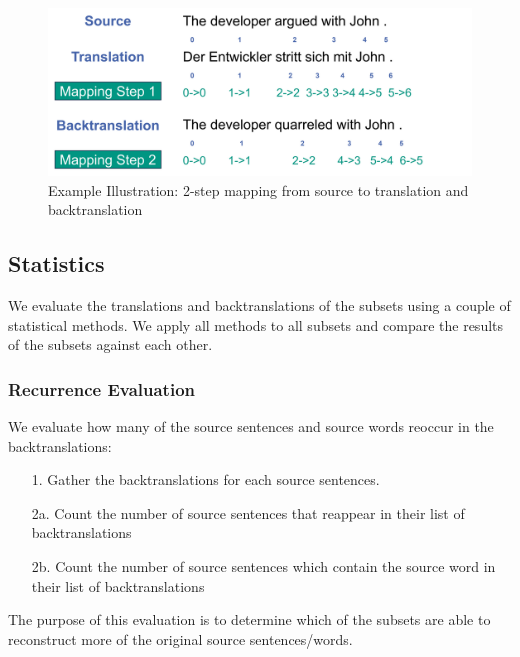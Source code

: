 \begin{figure}
  \centering
  \includegraphics[scale=0.5]{figures/alignment.png}
  \caption{Example Illustration: 2-step mapping from source to translation and backtranslation}
  \label{fig:alignment}
\end{figure}

\subsection{Statistics}
\label{sec:Experiments:Statistics}


We evaluate the translations and backtranslations of the subsets using a couple of statistical methods. We apply all methods to all subsets and compare the results of the subsets against each other.

\subsubsection{Recurrence Evaluation}
\label{sec:Experiments:Statistics:Recurrence}
We evaluate how many of the source sentences and source words reoccur in the backtranslations:

\begin{enumerate}
    \item[1. ] Gather the backtranslations for each source sentences.
    \item[2a. ] Count the number of source sentences that reappear in their list of backtranslations
    \item[2b. ] Count the number of source sentences which contain the source word in their list of backtranslations
\end{enumerate}

The purpose of this evaluation is to determine which of the subsets are able to reconstruct more of the original source sentences/words.

